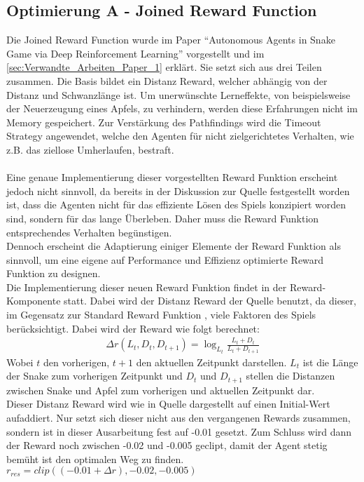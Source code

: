 \subsection{Optimierung A - Joined Reward Function} \label{subsec:Konzept_Optimierung01}
Die Joined Reward Function wurde im Paper "`Autonomous Agents in Snake Game via Deep Reinforcement Learning"' \cite{Autonomous_Agents_in_Snake_Game_via_DRL} vorgestellt und im \autoref{sec:Verwandte_Arbeiten_Paper_1} erklärt. Sie setzt sich aus drei Teilen zusammen. Die Basis bildet ein Distanz Reward, welcher abhängig von der Distanz und Schwanzlänge ist. Um unerwünschte Lerneffekte, von beispielsweise der Neuerzeugung eines Apfels, zu verhindern, werden diese Erfahrungen nicht im Memory gespeichert. Zur Verstärkung des Pathfindings wird die Timeout Strategy angewendet, welche den Agenten für nicht zielgerichtetes Verhalten, wie z.B. das ziellose Umherlaufen, bestraft.\\
\\Eine genaue Implementierung dieser vorgestellten Reward Funktion erscheint jedoch nicht sinnvoll, da bereits in der Diskussion  zur Quelle \cite{Autonomous_Agents_in_Snake_Game_via_DRL} festgestellt worden ist, dass die Agenten nicht für das effiziente Lösen des Spiels konzipiert worden sind, sondern für das lange Überleben. Daher muss die Reward Funktion entsprechendes Verhalten begünstigen.\\
Dennoch erscheint die Adaptierung einiger Elemente der Reward Funktion als sinnvoll, um eine eigene auf Performance und Effizienz optimierte Reward Funktion zu designen.\\
Die Implementierung dieser neuen Reward Funktion findet in der Reward-Komponente statt. 
Dabei wird der Distanz Reward der Quelle \cite{Autonomous_Agents_in_Snake_Game_via_DRL} benutzt, da dieser, im Gegensatz zur Standard Reward Funktion , viele Faktoren des Spiels berücksichtigt. Dabei wird der Reward wie folgt berechnet:
\begin{align}
	\Delta r(L_t, D_t,D_{t+1}) = \log_{L_t}\frac{L_t + D_t}{L_t + D_{t + 1}}
\end{align}
Wobei $t$ den vorherigen, $t+1$ den aktuellen Zeitpunkt darstellen. $L_t$ ist die Länge der Snake zum vorherigen Zeitpunkt und $D_t$ und $D_{t+1}$ stellen die Distanzen zwischen Snake und Apfel zum vorherigen und aktuellen Zeitpunkt dar.\\
Dieser Distanz Reward wird wie in Quelle \cite{Autonomous_Agents_in_Snake_Game_via_DRL} dargestellt auf einen Initial-Wert aufaddiert. Nur setzt sich dieser nicht aus den vergangenen Rewards zusammen, sondern ist in dieser Ausarbeitung fest auf -0.01 gesetzt. Zum Schluss wird dann der Reward noch zwischen -0.02 und -0.005 geclipt, damit der Agent stetig bemüht ist den optimalen Weg zu finden. $r_{res} = clip((-0.01 + \Delta r), -0.02, -0.005)$

